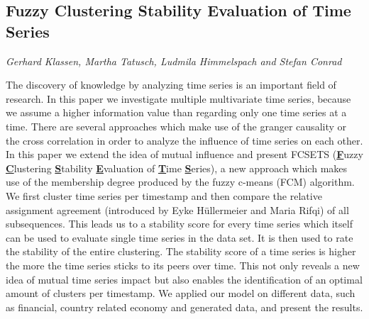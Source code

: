 \documentclass[../booklet.tex]{subfiles}
\begin{document}
\subsection[Fuzzy Clustering Stability Evaluation of Time Series. {\it Gerhard Klassen, Martha Tatusch, Ludmila Himmelspach and Stefan Conrad}]{Fuzzy Clustering Stability Evaluation of Time Series}
   

\begin{center}
  {\it Gerhard Klassen, Martha Tatusch, Ludmila Himmelspach and Stefan Conrad}
\end{center}



The discovery of knowledge by analyzing time series is an important field of research. In this paper we investigate multiple multivariate time series, because we assume a higher information value than regarding only one time series at a time. There are several approaches which make use of the granger causality or the cross correlation in order to analyze the influence of time series on each other. In this paper we extend the idea of mutual influence and present FCSETS (\textbf{\underline{F}}uzzy \textbf{\underline{C}}lustering \textbf{\underline{S}}tability \textbf{\underline{E}}valuation of \textbf{\underline{T}}ime \textbf{\underline{S}}eries), a new approach which makes use of the membership degree produced by the fuzzy c-means (FCM) algorithm. We first cluster time series per timestamp and then compare the relative assignment agreement (introduced by Eyke H{\"u}ller\-meier and Maria Rifqi) of all subsequences. This leads us to a stability score for every time series which itself can be used to evaluate single time series in the data set. It is then used to rate the stability of the entire clustering. The stability score of a time series is higher the more the time series sticks to its peers over time. This not only reveals a new idea of mutual time series impact but also enables the identification of an optimal amount of clusters per timestamp.
We applied our model on different data, such as financial, country related economy and generated data, and present the results.

\end{document}
